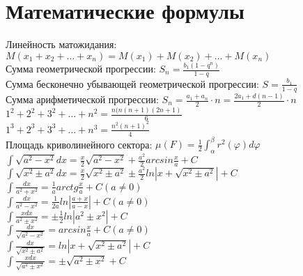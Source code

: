 \documentclass{article}
\begin{document}
\section*{Математические формулы}
Линейность матожидания: $M(x_1 + x_2 + \dots + x_n) = M(x_1) + M(x_2) + \dots + M(x_n)$ \\
Сумма геометрической прогрессии: $S_n = \frac{b_1 (1 - q^n)}{1 - q}$ \\
Сумма бесконечно убывающей геометрической прогрессии: $S = \frac{b_1}{1 - q}$ \\
Сумма арифметической прогрессии: $S_n = \frac{a_1 + a_n}{2} \cdot n = \frac{2a_1 + d(n - 1)}{2} \cdot n$ \\
$1^2 + 2^2 + 3^2 + \dots + n^2 = \frac{n(n(n + 1)(2n + 1)}{6}$ \\
$1^3 + 2^3 + 3^3 + \dots + n^3 = \frac{n^2 (n + 1)^2}{4}$ \\
Площадь криволинейного сектора: $\mu(F) = \frac{1}{2} \int_{\alpha}^{\beta} r^2(\varphi) d\varphi$ \\
$ \int \sqrt{a^2 - x^2} dx = \frac{x}{2} \sqrt{a^2 - x^2} + \frac{a^2}{2} arcsin \frac{x}{a} + C $ \\
$ \int \sqrt{x^2 \pm a^2} dx = \frac{x}{2} \sqrt {x^2 \pm a^2} \pm \frac{a^2}{2} ln |x + \sqrt{x^2 \pm a^2}| + C $ \\
$ \int \frac{dx}{a^2 + x^2} = \frac{1}{a} arctg \frac{x}{a} + C (a \ne 0) $ \\
$ \int \frac{dx}{a^2 - x^2} = \frac{1}{2a} ln |\frac{a + x}{a - x}| + C (a \ne 0) $ \\
$ \int \frac{x dx}{a^2 \pm x^2} = \pm \frac{1}{2} ln |a^2 \pm x^2| + C $ \\
$ \int \frac{dx}{\sqrt{a^2 - x^2}} = arcsin \frac{x}{a} + C (a \ne 0) $ \\
$ \int \frac{dx}{\sqrt{x^2 \pm a^2}} = ln |x + \sqrt{x^2 \pm a^2}| + C $ \\
$ \int \frac{x dx}{\sqrt{a^2 \pm x^2}} = \pm \sqrt{a^2 \pm x^2} + C $ \\
\end{document}
